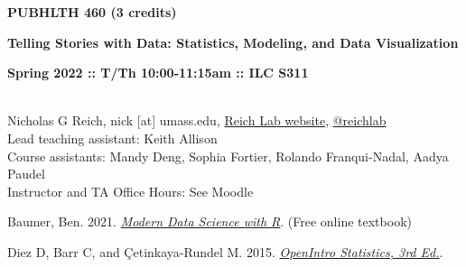 \documentclass[10pt]{article}
\begin{document}
\centerline{\bf \large PUBHLTH 460 (3 credits)}
\centerline{\bf \large Telling Stories with Data: Statistics, Modeling, and Data Visualization}
\centerline{\bf Spring 2022 :: T/Th 10:00-11:15am :: ILC S311 }

\vspace{.25in}
\\
\noindent Nicholas G Reich,  nick [at] umass.edu,  \href{http://reichlab.github.io}{Reich Lab website},  \href{https://twitter.com/reichlab}{@reichlab}\\
\noindent Lead teaching assistant: Keith Allison\\
\noindent Course assistants:
Mandy Deng, Sophia Fortier, Rolando Franqui-Nadal, Aadya Paudel\\
\noindent Instructor and TA Office Hours: See Moodle






\bigskip
{}


Baumer, Ben. 2021.  \emph{\href{https://mdsr-book.github.io/mdsr2e/}{Modern Data Science with R}}. (Free online textbook)





Diez D, Barr C, and \c{C}etinkaya-Rundel M. 2015. \emph{\href{http://www.openintro.org/stat/index.php}{OpenIntro Statistics, 3rd Ed.}}.
\end{document}
